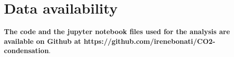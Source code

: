 \documentclass[fleqn,usenatbib]{mnras}
\providecommand{\DIFadd}[1]{{\bf #1}} %
\providecommand{\DIFaddend}{} %
\DeclareRobustCommand{\DIFaddend}{\DIFOaddend \let\includegraphics\DIFOincludegraphics} %
\begin{document}
\section*{\DIFadd{Data availability}}
\DIFadd{The code and the jupyter notebook files used for the analysis are available on Github at https://github.com/irenebonati/CO2-condensation}\DIFaddend .













\bsp	%
\label{lastpage}
\end{document}
